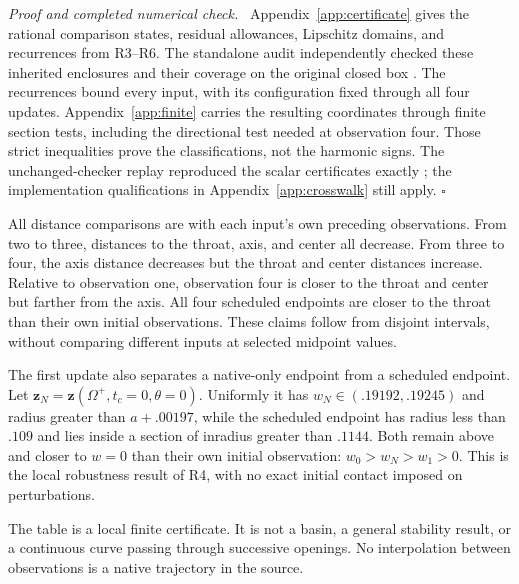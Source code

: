 \documentclass[11pt,a4paper]{article}
\numberwithin{equation}{section}
\newenvironment{proof}[1][Proof]{\par\noindent\textit{#1.}\ \ignorespaces}
{\unskip\nobreak\hfill$\square$\par}
\newcommand{\zobs}{\mathbf z}
\begin{document}
\begin{proof}[Proof and completed numerical check]
Appendix~\ref{app:certificate} gives the rational comparison states, residual
allowances, Lipschitz domains, and recurrences from R3--R6. The standalone
audit independently checked these inherited enclosures and their coverage
on the original closed box \cite{Audit}. The recurrences bound every input,
with its configuration fixed through all four updates.
Appendix~\ref{app:finite} carries the resulting coordinates through finite
section tests, including the directional test needed at observation four.
Those strict inequalities prove the classifications, not the harmonic signs.
The unchanged-checker replay reproduced the scalar certificates exactly
\cite{GPTAudit}; the implementation qualifications in
Appendix~\ref{app:crosswalk} still apply.
\end{proof}

All distance comparisons are with each input's own preceding observations.
From two to three, distances to the throat, axis, and center all decrease.
From three to four, the axis distance decreases but the throat and center
distances increase. Relative to observation one, observation four is closer
to the throat and center but farther from the axis. All four scheduled
endpoints are closer to the throat than their own initial observations.
These claims follow from disjoint intervals, without comparing different
inputs at selected midpoint values.

The first update also separates a native-only endpoint from a scheduled
endpoint. Let
$\zobs_N=\zobs(\Omega^+,t_c=0,\theta=0)$.
Uniformly it has $w_N\in(.19192,.19245)$ and radius greater than
$a+.00197$, while the scheduled endpoint has radius less than $.109$ and
lies inside a section of inradius greater than $.1144$.
Both remain above and closer to $w=0$ than their own initial observation:
$w_0>w_N>w_1>0$. This is the local robustness result of R4, with no exact
initial contact imposed on perturbations.

The table is a local finite certificate. It is not a basin, a general
stability result, or a continuous curve passing through successive openings.
No interpolation between observations is a native trajectory in the source.
\end{document}
